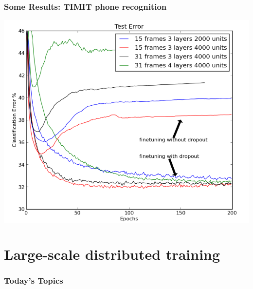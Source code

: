 \documentclass{beamer}
\begin{document}
\begin{frame}
\frametitle{Some Results: TIMIT phone recognition}
\centerline{\includegraphics[scale=0.3]{figs/dropout_timit}}
\end{frame}




\section{Large-scale distributed training \cite{dean12distributed}}
\begin{frame}
\frametitle{Today's Topics}
\tableofcontents
\end{frame}
\end{document}
